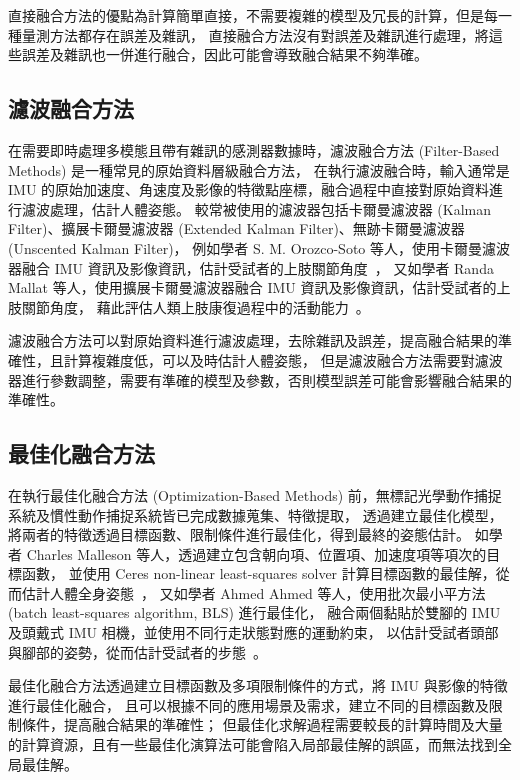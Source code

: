 直接融合方法的優點為計算簡單直接，不需要複雜的模型及冗長的計算，但是每一種量測方法都存在誤差及雜訊，
直接融合方法沒有對誤差及雜訊進行處理，將這些誤差及雜訊也一併進行融合，因此可能會導致融合結果不夠準確。

\subsection*{濾波融合方法}
在需要即時處理多模態且帶有雜訊的感測器數據時，濾波融合方法 (Filter-Based Methods) 是一種常見的原始資料層級融合方法，
在執行濾波融合時，輸入通常是 IMU 的原始加速度、角速度及影像的特徵點座標，融合過程中直接對原始資料進行濾波處理，估計人體姿態。
較常被使用的濾波器包括卡爾曼濾波器 (Kalman Filter)、擴展卡爾曼濾波器 (Extended Kalman Filter)、無跡卡爾曼濾波器 (Unscented Kalman Filter)，
例如學者 S. M. Orozco-Soto 等人，使用卡爾曼濾波器融合 IMU 資訊及影像資訊，估計受試者的上肢關節角度~\cite{orozco2019development}，
又如學者 Randa Mallat 等人，使用擴展卡爾曼濾波器融合 IMU 資訊及影像資訊，估計受試者的上肢關節角度，
藉此評估人類上肢康復過程中的活動能力~\cite{mallat2020upper}。

濾波融合方法可以對原始資料進行濾波處理，去除雜訊及誤差，提高融合結果的準確性，且計算複雜度低，可以及時估計人體姿態，
但是濾波融合方法需要對濾波器進行參數調整，需要有準確的模型及參數，否則模型誤差可能會影響融合結果的準確性。

\subsection*{最佳化融合方法}
在執行最佳化融合方法 (Optimization-Based Methods) 前，無標記光學動作捕捉系統及慣性動作捕捉系統皆已完成數據蒐集、特徵提取，
透過建立最佳化模型，將兩者的特徵透過目標函數、限制條件進行最佳化，得到最終的姿態估計。
如學者 Charles Malleson 等人，透過建立包含朝向項、位置項、加速度項等項次的目標函數，
並使用 Ceres non-linear least-squares solver 計算目標函數的最佳解，從而估計人體全身姿態~\cite{malleson2017real}，
又如學者 Ahmed Ahmed 等人，使用批次最小平方法 (batch least-squares algorithm, BLS) 進行最佳化，
融合兩個黏貼於雙腳的 IMU 及頭戴式 IMU 相機，並使用不同行走狀態對應的運動約束，
以估計受試者頭部與腳部的姿勢，從而估計受試者的步態~\cite{ahmed2018visual}。

最佳化融合方法透過建立目標函數及多項限制條件的方式，將 IMU 與影像的特徵進行最佳化融合，
且可以根據不同的應用場景及需求，建立不同的目標函數及限制條件，提高融合結果的準確性；
但最佳化求解過程需要較長的計算時間及大量的計算資源，且有一些最佳化演算法可能會陷入局部最佳解的誤區，而無法找到全局最佳解。

